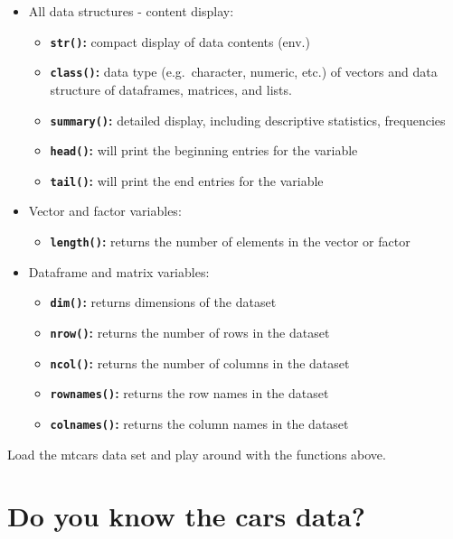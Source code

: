 \documentclass[
]{article}
\providecommand{\tightlist}{%
  \setlength{\itemsep}{0pt}\setlength{\parskip}{0pt}}
\begin{document}
\begin{itemize}
\tightlist
\item
  All data structures - content display:

  \begin{itemize}
  \tightlist
  \item
    \textbf{\texttt{str()}:} compact display of data contents (env.)
  \item
    \textbf{\texttt{class()}:} data type (e.g.~character, numeric, etc.)
    of vectors and data structure of dataframes, matrices, and lists.
  \item
    \textbf{\texttt{summary()}:} detailed display, including descriptive
    statistics, frequencies
  \item
    \textbf{\texttt{head()}:} will print the beginning entries for the
    variable
  \item
    \textbf{\texttt{tail()}:} will print the end entries for the
    variable
  \end{itemize}
\item
  Vector and factor variables:

  \begin{itemize}
  \tightlist
  \item
    \textbf{\texttt{length()}:} returns the number of elements in the
    vector or factor
  \end{itemize}
\item
  Dataframe and matrix variables:

  \begin{itemize}
  \tightlist
  \item
    \textbf{\texttt{dim()}:} returns dimensions of the dataset
  \item
    \textbf{\texttt{nrow()}:} returns the number of rows in the dataset
  \item
    \textbf{\texttt{ncol()}:} returns the number of columns in the
    dataset
  \item
    \textbf{\texttt{rownames()}:} returns the row names in the dataset\\
  \item
    \textbf{\texttt{colnames()}:} returns the column names in the
    dataset
  \end{itemize}
\end{itemize}

Load the mtcars data set and play around with the functions above.

\hypertarget{do-you-know-the-cars-data}{%
\section{Do you know the cars data?}\label{do-you-know-the-cars-data}}
\end{document}
